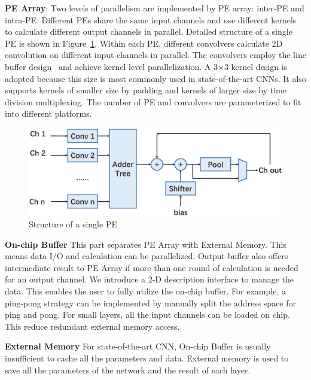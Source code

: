 \documentclass[10pt, conference, compsocconf]{IEEEtran}
\begin{document}
\textbf{PE Array}: Two levels of parallelism are implemented by PE array: inter-PE and intra-PE. Different PEs share the same input channels and use different kernels to calculate different output channels in parallel. Detailed structure of a single PE is shown in Figure~\ref{fig:pe}. Within each PE, different convolvers calculate 2D convolution on different input channels in parallel. The convolvers employ the line buffer design~\cite{bosi1999reconfigurable} and achieve kernel level parallelization. A 3$\times$3 kernel design is adopted because this size is most commonly used in state-of-the-art CNNs. It also supports kernels of smaller size by padding and kernels of larger size by time division multiplexing. The number of PE and convolvers are parameterized to fit into different platforms.

\begin{figure}[t]
  \centering
  \includegraphics[width=1.0\columnwidth]{figure/pe.eps}
  \small
  \caption{Structure of a single PE}
  \label{fig:pe}
\end{figure}

\textbf{On-chip Buffer} This part separates PE Array with External Memory. This means data I/O and calculation can be parallelized. Output buffer also offers intermediate result to PE Array if more than one round of calculation is needed for an output channel. We introduce a 2-D description interface to manage the data. This enables the user to fully utilize the on-chip buffer. For example, a ping-pong strategy can be implemented by manually split the address space for ping and pong. For small layers, all the input channels can be loaded on chip. This reduce redundant external memory access.

\textbf{External Memory} For state-of-the-art CNN, On-chip Buffer is usually insufficient to cache all the parameters and data. External memory is used to save all the parameters of the network and the result of each layer.
\end{document}
